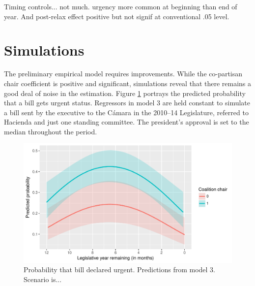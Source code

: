 \documentclass[letter,12pt]{article}
\begin{document}
Timing controls... not much. urgency more common at beginning than end of year. And post-relax effect positive but not signif at conventional .05 level. 


\section{Simulations}

The preliminary empirical model requires improvements. While the co-partisan chair coefficient is positive and significant, simulations reveal that there remains a good deal of noise in the estimation. Figure \ref{F:sims} portrays the predicted probability that a bill gets urgent status. Regressors in model 3 are held constant to simulate a bill sent by the executive to the Cámara in the 2010--14 Legislature, referred to Hacienda and just one standing committee. The president's approval is set to the median throughout the period. 

\begin{figure}
\begin{center}
 \includegraphics[width=.75\columnwidth]{../graphs/predictedPr.pdf}
\end{center}
\caption{Probability that bill declared urgent. Predictions from model 3. Scenario is...}
\label{F:sims}
\end{figure}
\end{document}
